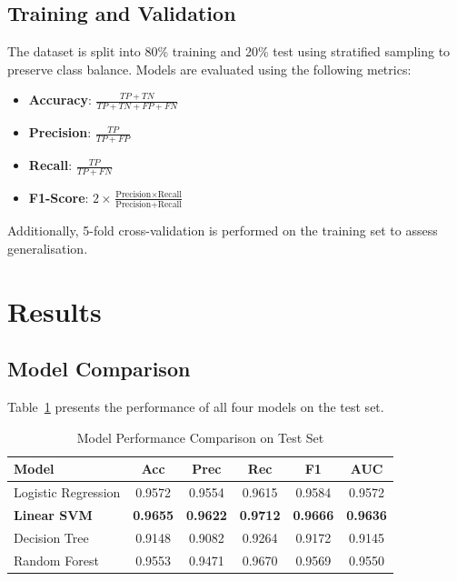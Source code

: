 \documentclass[conference]{IEEEtran}
\begin{document}
\subsection{Training and Validation}

The dataset is split into 80\% training and 20\% test using stratified sampling to preserve class balance. Models are evaluated using the following metrics:

\begin{itemize}
    \item \textbf{Accuracy}: $\frac{TP + TN}{TP + TN + FP + FN}$
    \item \textbf{Precision}: $\frac{TP}{TP + FP}$
    \item \textbf{Recall}: $\frac{TP}{TP + FN}$
    \item \textbf{F1-Score}: $2 \times \frac{\text{Precision} \times \text{Recall}}{\text{Precision} + \text{Recall}}$
\end{itemize}

Additionally, 5-fold cross-validation is performed on the training set to assess generalisation.

\section{Results}

\subsection{Model Comparison}

Table~\ref{tab:results} presents the performance of all four models on the test set.

\begin{table}[ht]
\centering
\caption{Model Performance Comparison on Test Set}
\begin{tabular}{lccccc}
\toprule
Model & Acc & Prec & Rec & F1 & AUC \\
\midrule
Logistic Regression & 0.9572 & 0.9554 & 0.9615 & 0.9584 & 0.9572 \\
\textbf{Linear SVM} & \textbf{0.9655} & \textbf{0.9622} & \textbf{0.9712} & \textbf{0.9666} & \textbf{0.9636} \\
Decision Tree & 0.9148 & 0.9082 & 0.9264 & 0.9172 & 0.9145 \\
Random Forest & 0.9553 & 0.9471 & 0.9670 & 0.9569 & 0.9550 \\
\bottomrule
\end{tabular}
\label{tab:results}
\end{table}
\end{document}
